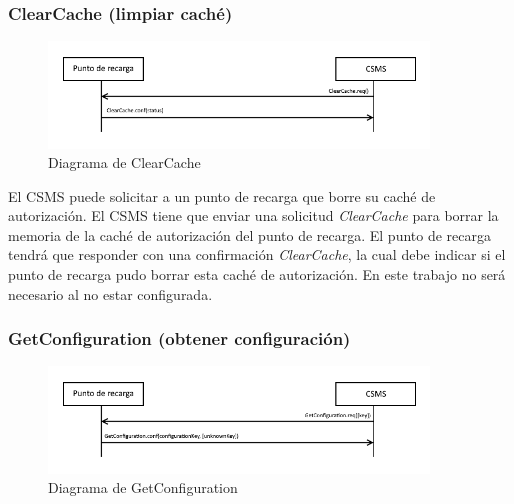 \documentclass[12pt,a4paper,onecolumn,oneside]{report}
\begin{document}
\subsubsection{ClearCache (limpiar caché)}
\label{ClearCache (limpiar caché)}


\begin{figure}[h] 
\centering
  \includegraphics[width=0.9\textwidth]{figuras/diagramaclearcache.png}
  \caption[Diagrama de \textit{ClearCache}]{Diagrama de ClearCache\\
  }
  \label{fig:diagramaclearcache}
\end{figure}

El CSMS puede solicitar a un punto de recarga que borre su caché de autorización. El CSMS tiene que enviar una solicitud \textit{ClearCache} para borrar la memoria de la caché de autorización del punto de recarga. El punto de recarga tendrá que responder con una confirmación \textit{ClearCache}, la cual debe indicar si el punto de recarga pudo borrar esta caché de autorización. En este trabajo no será necesario al no estar configurada.


\subsubsection{GetConfiguration (obtener configuración)}
\label{GetConfiguration (obtener configuración)}



\begin{figure}[h] 
\centering
  \includegraphics[width=0.9\textwidth]{figuras/diagramagetconfiguration.png}
  \caption[Diagrama de \textit{GetConfiguration}]{Diagrama de GetConfiguration\\
  }
  \label{fig:diagramagetconfiguration}
\end{figure}
\end{document}
